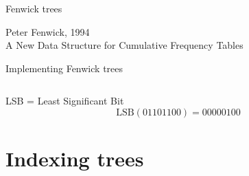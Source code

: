 \documentclass[xcolor={usenames,dvipsnames,svgnames,table},12pt]{beamer}
\newenvironment{xframe}[1][]
  {\begin{frame}[fragile,environment=xframe,#1]}
  {\end{frame}}
\begin{document}
\begin{xframe}{Fenwick trees}
  \begin{center}
    \begin{minipage}{0.45\textwidth}
    \end{minipage}
    \hspace{0.25in}
    \begin{minipage}{0.45\textwidth}
      Peter Fenwick, 1994 \\
      A New Data Structure for Cumulative Frequency Tables
    \end{minipage}
  \end{center}
\end{xframe}

\begin{xframe}{Implementing Fenwick trees}
  \inputminted[fontsize=\footnotesize]{java}{FenwickTree.java}
\end{xframe}


\begin{xframe}{LSB = Least Significant Bit}
  \[ \mathrm{LSB}(01101100) = 00000100 \]
  \bigskip

\end{xframe}

\section{Indexing trees}
\end{document}
